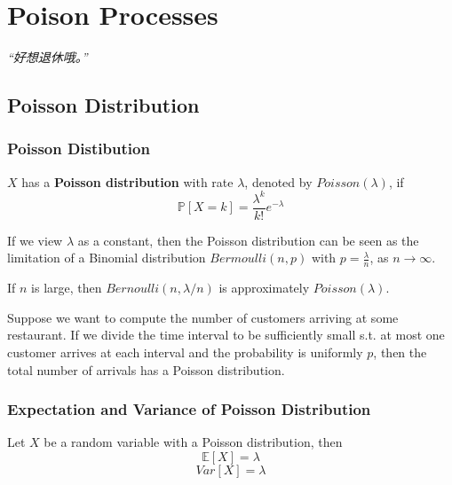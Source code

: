 \chapter{Poison Processes}
\emph{“好想退休哦。”}
\newpage

\section{Poisson Distribution}
    \subsection{Poisson Distibution}
    \begin{definition}
        $X$ has a \textbf{Poisson distribution} with rate $\lambda$, denoted by $Poisson(\lambda)$, if
        \[ \mathbb{P}[X=k] = \frac{\lambda^k}{k!}e^{-\lambda} \]
    \end{definition}
    \begin{remark}
        If we view $\lambda$ as a constant, then the Poisson distribution can be seen as the limitation of a Binomial distribution $Bermoulli(n, p)$ with $p = \frac{\lambda}{n}$, as $n\to\infty$.
    \end{remark}
    \begin{theorem}
        If $n$ is large, then $Bernoulli(n, \lambda/n)$ is approximately $Poisson(\lambda)$.
    \end{theorem}

    Suppose we want to compute the number of customers arriving at some restaurant. If we divide the time interval to be sufficiently small s.t. at most one customer arrives at each interval and the probability is uniformly $p$, then the total number of arrivals has a Poisson distribution.

    \subsection{Expectation and Variance of Poisson Distribution}
    Let $X$ be a random variable with a Poisson distribution, then
    \[ \mathbb{E}[X] = \lambda \]
    \[ Var[X] = \lambda \]

